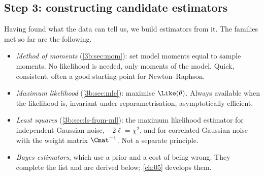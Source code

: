 \subsection{Step 3: constructing candidate estimators}
\label{3b:sec:recipe-candidates}

Having found what the data can tell us, we build estimators from it. The
families met so far are the following.
\begin{itemize}
  \item \emph{Method of moments} (\cref{3b:sec:mom}): set model moments equal
        to sample moments. No likelihood is needed, only moments of the
        model. Quick, consistent, often a good starting point for Newton--Raphson.
  \item \emph{Maximum likelihood} (\cref{3b:sec:mle}): maximise
        $\Like(\theta)$. Always available when the likelihood is, invariant
        under reparametrisation, asymptotically efficient.
  \item \emph{Least squares} (\cref{3b:sec:ls-from-ml}): the maximum likelihood estimator
        for independent Gaussian noise, $-2\ell=\chi^2$, and for correlated
        Gaussian noise with the weight matrix $\Cmat^{-1}$. Not a separate
        principle.
  \item \emph{Bayes estimators}, which use a prior and a cost of being wrong.
        They complete the list and are derived below; \cref{ch:05}
        develops them.
\end{itemize}

